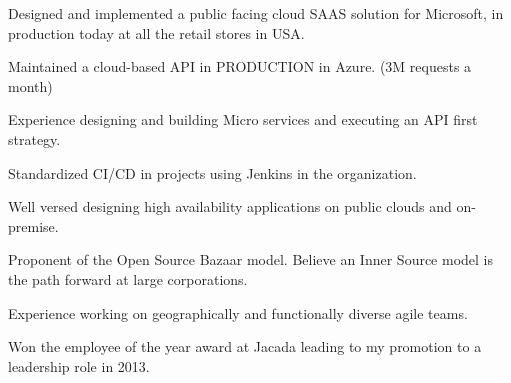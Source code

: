 

\begin{cventries}

  \cvhighlights
    {
      \begin{cvitems} %
        \item {Designed and implemented a public facing cloud SAAS solution for Microsoft, in production today at all the retail stores in USA.}
        \item {Maintained a cloud-based API in PRODUCTION in Azure. (3M requests a month)}
        \item {Experience designing and building Micro services and executing an API first strategy.}
        \item {Standardized CI/CD in projects using Jenkins in the organization.}
        \item {Well versed designing high availability applications on public clouds and on-premise.}
        \item {Proponent of the Open Source Bazaar model. Believe an Inner Source model is the path forward at large corporations.}
        \item {Experience working on geographically and functionally diverse agile teams.}
        \item {Won the employee of the year award at Jacada leading to my promotion to a leadership role in 2013.}
      \end{cvitems}
    }
    

\end{cventries}
